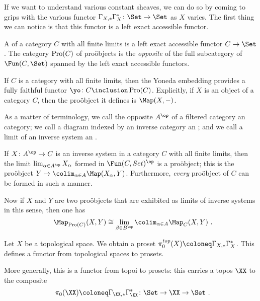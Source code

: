 If we want to understand various constant sheaves, we can do so by coming to grips with the various functor $ \Gamma_{X, \ast} \Gammaupperstar_X \colon \Set \to \Set $ as $ X $ varies.
The first thing we can notice is that this functor is a left exact accessible functor.

\begin{dfn}
	A  of a category $ C $ with all finite limits is a left exact accessible functor $ C \to \Set $.
	The category $ \operatorname{Pro}(C) $ of proöbjects is the \emph{opposite} of the full subcategory of $ \Fun(C, \Set) $ spanned by the left exact accessible functors.
\end{dfn}

\begin{exm}
	If $ C $ is a category with all finite limits, then the Yoneda embedding provides a fully faithful functor $ \yo \colon C \inclusion \Pro(C) $.
	Explicitly, if $ X $ is an object of a category $ C $, then the proöbject it defines is $ \Map(X, -) $.
\end{exm}

\begin{exm}
	As a matter of terminology, we call the opposite $ A^{\op} $ of a filtered category an  category;
	we call a diagram indexed by an inverse category an ;
	and we call a limit of an inverse system an .

	If $ X \colon A^{\op} \to C $ is an inverse system in a category $ C $ with all finite limits, then the limit $ \lim_{\alpha \in A^{\op}} X_{\alpha} $ formed in $ \Fun(C, Set)^{\op} $ is a proöbject;
	this is the proöbject $ Y \mapsto \colim_{\alpha \in A} \Map(X_{\alpha}, Y) $.
	Furthermore, \emph{every} proöbject of $ C $ can be formed in such a manner.

	Now if $ X $ and $ Y $ are two proöbjects that are exhibited as limits of inverse systems in this sense, then one has
	\[
		\Map_{\Pro(C)}(X, Y) \cong \lim_{\beta \in B^{\op}} \colim_{\alpha \in A} \Map_C(X, Y) \period
	\]
\end{exm}

\begin{exm}
	Let $ X $ be a topological space.
	We obtain a proset $ \pi^{\toptextit}_0(X) \coloneq \Gamma_{X, \ast}\Gammaupperstar_X $.
	This defines a functor from topological spaces to prosets.

	More generally, this is a functor from topoi to prosets:
	this carries a topos $ \XX $ to the composite
	\[
		\pi_0(\XX) \coloneq \Gamma_{\XX, \ast} \Gammaupperstar_{\XX} \colon \Set \to \XX \to \Set \period
	\]
\end{exm}

